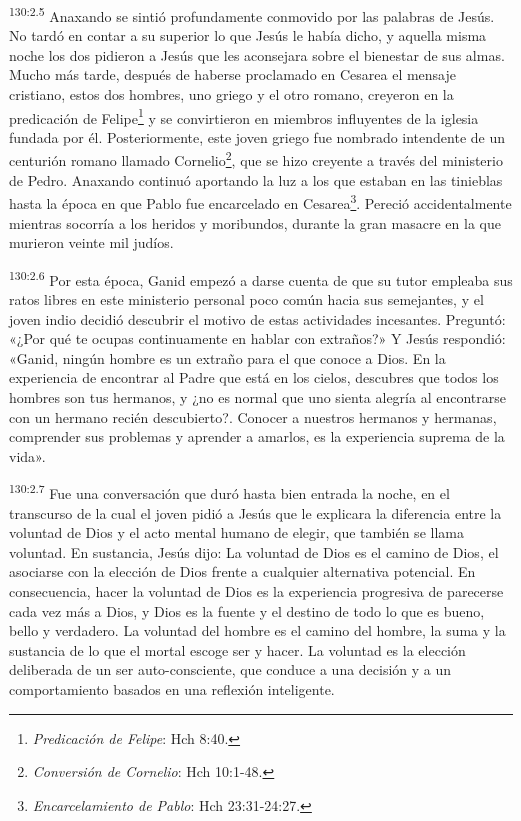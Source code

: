 \par
\textsuperscript{130:2.5} Anaxando se sintió profundamente conmovido por las palabras de Jesús. No tardó en contar a su superior lo que Jesús le había dicho, y aquella misma noche los dos pidieron a Jesús que les aconsejara sobre el bienestar de sus almas. Mucho más tarde, después de haberse proclamado en Cesarea el mensaje cristiano, estos dos hombres, uno griego y el otro romano, creyeron en la predicación de Felipe\footnote{\textit{Predicación de Felipe}: Hch 8:40.} y se convirtieron en miembros influyentes de la iglesia fundada por él. Posteriormente, este joven griego fue nombrado intendente de un centurión romano llamado Cornelio\footnote{\textit{Conversión de Cornelio}: Hch 10:1-48.}, que se hizo creyente a través del ministerio de Pedro. Anaxando continuó aportando la luz a los que estaban en las tinieblas hasta la época en que Pablo fue encarcelado en Cesarea\footnote{\textit{Encarcelamiento de Pablo}: Hch 23:31-24:27.}. Pereció accidentalmente mientras socorría a los heridos y moribundos, durante la gran masacre en la que murieron veinte mil judíos.

\par
\textsuperscript{130:2.6} Por esta época, Ganid empezó a darse cuenta de que su tutor empleaba sus ratos libres en este ministerio personal poco común hacia sus semejantes, y el joven indio decidió descubrir el motivo de estas actividades incesantes. Preguntó: «¿Por qué te ocupas continuamente en hablar con extraños?» Y Jesús respondió: «Ganid, ningún hombre es un extraño para el que conoce a Dios. En la experiencia de encontrar al Padre que está en los cielos, descubres que todos los hombres son tus hermanos, y ¿no es normal que uno sienta alegría al encontrarse con un hermano recién descubierto?. Conocer a nuestros hermanos y hermanas, comprender sus problemas y aprender a amarlos, es la experiencia suprema de la vida».

\par
\textsuperscript{130:2.7} Fue una conversación que duró hasta bien entrada la noche, en el transcurso de la cual el joven pidió a Jesús que le explicara la diferencia entre la voluntad de Dios y el acto mental humano de elegir, que también se llama voluntad. En sustancia, Jesús dijo: La voluntad de Dios es el camino de Dios, el asociarse con la elección de Dios frente a cualquier alternativa potencial. En consecuencia, hacer la voluntad de Dios es la experiencia progresiva de parecerse cada vez más a Dios, y Dios es la fuente y el destino de todo lo que es bueno, bello y verdadero. La voluntad del hombre es el camino del hombre, la suma y la sustancia de lo que el mortal escoge ser y hacer. La voluntad es la elección deliberada de un ser auto-consciente, que conduce a una decisión y a un comportamiento basados en una reflexión inteligente.

